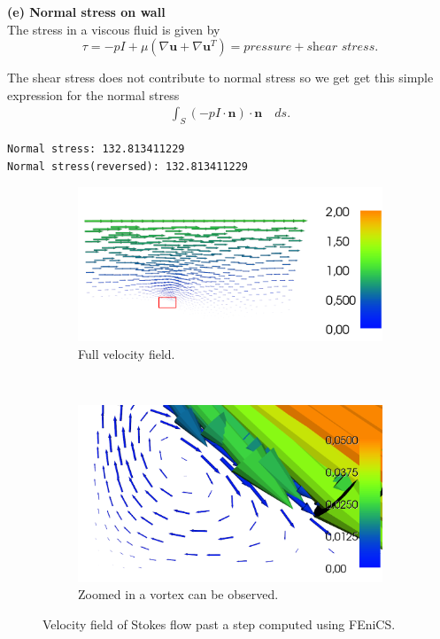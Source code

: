 \documentclass[11pt,a4paper,english]{article}
\numberwithin{equation}{section}
\begin{document}
\textbf{(e) Normal stress on wall} \\

The stress in a viscous fluid is given by 
\begin{equation}
\tau = -pI + \mu (\nabla \mathbf{u}  + \nabla \mathbf{u}^T  ) = pressure + \textit{shear stress}. 
\end{equation}

The shear stress does not contribute to normal stress so we get get this simple expression for the normal stress
\begin{align*}
\int_{S} (-p I \cdot \mathbf{n} ) \cdot \mathbf{n} \quad ds.
\end{align*}

\texttt{Normal stress:  132.813411229} \\
\texttt{Normal stress(reversed):  132.813411229 }

\newpage


\begin{figure}[t!]
    \centering
    \begin{subfigure}[b]{0.5\textwidth}
        \centering
        \includegraphics[scale=0.25]{vel_step1.png}
        \caption{Full velocity field.}
    \end{subfigure}%
    ~ 
    \begin{subfigure}[b]{0.5\textwidth} 
        \centering
        \includegraphics[scale=0.18]{vel_step2.png}
        \caption{Zoomed in a vortex can be observed.}
    \end{subfigure}
    \caption{Velocity field of Stokes flow past a step computed using FEniCS.}
\end{figure}
\end{document}
